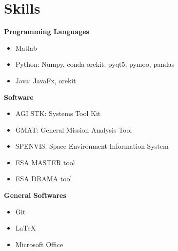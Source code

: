 \documentclass[11pt,a4paper, sans]{moderncv}
\begin{document}
\section{Skills}
\vspace{5pt}
\textbf{Programming Languages}
\begin{itemize}
\item {Matlab}
\item{Python: Numpy, conda-orekit, pyqt5, pymoo, pandas}
\item{Java: JavaFx, orekit}
\end{itemize}
\vspace{5pt}
\textbf{Software}
\begin{itemize}
\item{AGI STK: Systems Tool Kit}
\item{GMAT: General Mission Analysis Tool}
\item{SPENVIS: Space Environment Information System}
\item{ESA MASTER tool}
\item{ESA DRAMA tool}
\end{itemize}
\vspace{5pt}
\textbf{General Softwares}
\begin{itemize}
\item {Git}
\item {LaTeX}
\item {Microsoft Office}
\end{itemize}

\end{document}
